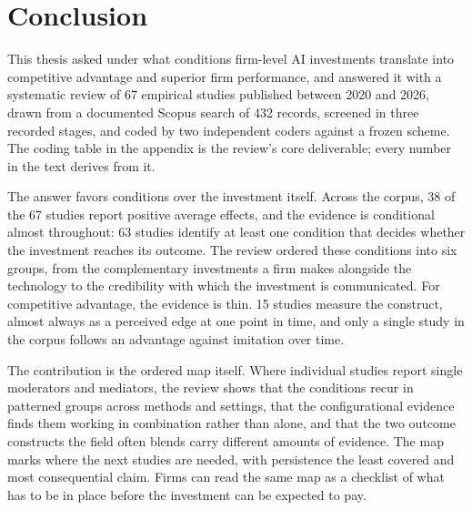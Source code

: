 \chapter{Conclusion}
\label{sec:conclusion}

This thesis asked under what conditions firm-level AI investments translate into
competitive advantage and superior firm performance, and answered it with a systematic
review of 67 empirical studies published between 2020 and 2026, drawn from a documented
Scopus search of 432 records, screened in three recorded stages, and coded by two
independent coders against a frozen scheme. The coding table in the appendix is the
review's core deliverable; every number in the text derives from it.

The answer favors conditions over the investment itself. Across the corpus, 38 of the
67 studies report positive average effects, and the evidence is conditional almost
throughout: 63 studies identify at least one condition
that decides whether the investment reaches its outcome. The review ordered these
conditions into six groups, from the complementary investments a firm makes alongside
the technology to the credibility with which the investment is communicated. For
competitive advantage, the evidence is thin. 15 studies measure the construct, almost
always as a perceived edge at one point in time, and only a single study in the corpus
follows an advantage against imitation over time.

The contribution is the ordered map itself. Where individual studies report single
moderators and mediators, the review shows that the conditions recur in patterned
groups across methods and settings, that the configurational evidence finds them
working in combination rather than alone, and that the two outcome constructs the field
often blends carry different amounts of evidence. The map marks where the next studies
are needed, with persistence the least covered and most consequential claim. Firms can
read the same map as a checklist of what has to be in place before the investment can
be expected to pay.
